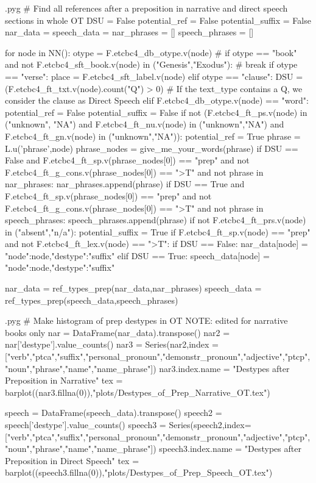 \documentclass{report}
\makeatletter
\newenvironment{python}{%
  \VerbatimEnvironment
  \minted@resetoptions
  \setkeys{minted@opt}{}
      \begin{VerbatimOut}{\jobname.pyg}}
{%
      \end{VerbatimOut}
      \minted@pygmentize{python}
      \DeleteFile{\jobname.pyg}}
\makeatother
\begin{document}
\begin{python}
# Find all references after a preposition in narrative and direct speech sections in whole OT 
DSU = False
potential_ref = False
potential_suffix = False
nar_data = {}
speech_data = {}
nar_phrases = []
speech_phrases = []

for node in NN():
    otype = F.etcbc4_db_otype.v(node)
#    if otype == "book" and not F.etcbc4_sft_book.v(node) in ("Genesis","Exodus"):
#        break
    if otype == "verse":
        place = F.etcbc4_sft_label.v(node)
    elif otype == "clause":
        DSU = (F.etcbc4_ft_txt.v(node).count("Q") > 0)    # If the text_type contains a Q, we consider the clause as Direct Speech
    elif F.etcbc4_db_otype.v(node) == "word":
        potential_ref = False
        potential_suffix = False
        if not (F.etcbc4_ft_ps.v(node) in ("unknown", "NA") and F.etcbc4_ft_nu.v(node) in ("unknown","NA") and F.etcbc4_ft_gn.v(node) in ("unknown","NA")):
            potential_ref = True
            phrase = L.u('phrase',node)
            phrase_nodes = give_me_your_words(phrase)
            if DSU == False and F.etcbc4_ft_sp.v(phrase_nodes[0]) == "prep" and not F.etcbc4_ft_g_cons.v(phrase_nodes[0]) == ">T" and not phrase in nar_phrases:
                nar_phrases.append(phrase)
            if DSU == True and F.etcbc4_ft_sp.v(phrase_nodes[0]) == "prep" and not F.etcbc4_ft_g_cons.v(phrase_nodes[0]) == ">T" and not phrase in speech_phrases:
                speech_phrases.append(phrase) 
        if not F.etcbc4_ft_prs.v(node) in ("absent","n/a"):
            potential_suffix = True
            if F.etcbc4_ft_sp.v(node) == "prep" and not F.etcbc4_ft_lex.v(node) == ">T":
                if DSU == False:
                    nar_data[node] = {"node":node,"destype":"suffix"}
                elif DSU == True:
                    speech_data[node] = {"node":node,"destype":"suffix"}

nar_data = ref_types_prep(nar_data,nar_phrases)
speech_data = ref_types_prep(speech_data,speech_phrases)

\end{python}

\begin{python}
# Make histogram of prep destypes in OT NOTE: edited for narrative books only
nar = DataFrame(nar_data).transpose()
nar2 = nar['destype'].value_counts()
nar3 = Series(nar2,index = ["verb","ptca","suffix","personal_pronoun","demonstr_pronoun","adjective","ptcp","noun","phrase","name","name_phrase"])
nar3.index.name = "Destypes after Preposition in Narrative"
tex = barplot((nar3.fillna(0)),"plots/Destypes_of_Prep_Narrative_OT.tex")

speech = DataFrame(speech_data).transpose()
speech2 = speech['destype'].value_counts()
speech3 = Series(speech2,index=["verb","ptca","suffix","personal_pronoun","demonstr_pronoun","adjective","ptcp","noun","phrase","name","name_phrase"])
speech3.index.name = "Destypes after Preposition in Direct Speech"
tex = barplot((speech3.fillna(0)),"plots/Destypes_of_Prep_Speech_OT.tex")

\end{python}
\end{document}
